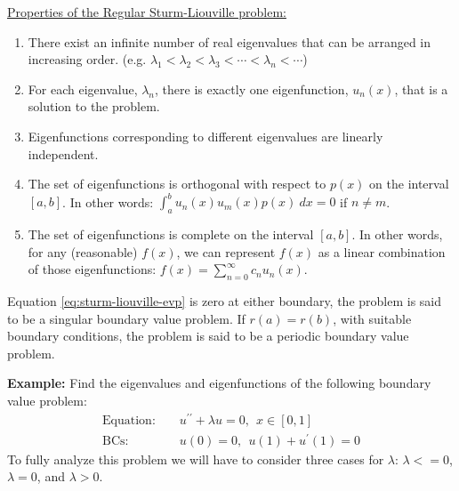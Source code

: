 \vspace{5.0cm}

\noindent\underline{Properties of the Regular Sturm-Liouville problem:}
\begin{enumerate}
\item There exist an infinite number of real eigenvalues that can be arranged in increasing order. (e.g. $\lambda_1 < \lambda_2 < \lambda_3 < \cdots < \lambda_n < \cdots$)
\item For each eigenvalue, $\lambda_n$, there is exactly one eigenfunction, $u_n(x)$, that is a solution to the problem.

\item Eigenfunctions corresponding to different eigenvalues are linearly independent.

\item The set of eigenfunctions is orthogonal with respect to $p(x)$ on the interval $[a,b]$.  In other words: $\int_{a}^{b}u_n(x) u_m(x) p(x) \ dx = 0$ if $n \ne m$.

\item The set of eigenfunctions is complete on the interval $[a,b]$.  In other words, for any (reasonable) $f(x)$, we can represent $f(x)$ as a linear combination of those eigenfunctions: $f(x) = \sum_{n=0}^{\infty} c_n u_n(x)$.
\end{enumerate}


 Equation \ref{eq:sturm-liouville-evp} is zero at either boundary, the problem is said to be a singular boundary value problem.  If $r(a) = r(b)$, with suitable boundary conditions, the problem is said to be a periodic boundary value problem.

\vspace{1.0cm}

\noindent\textbf{Example:} Find the eigenvalues and eigenfunctions of the following boundary value problem:
\begin{align*}
\text{Equation: }& & u^{\prime \prime}+\lambda u = 0,  \ \ x\in[0,1] \\
\text{BCs: }& & u(0) = 0, \ \ u(1) + u^{\prime}(1) = 0
\end{align*}
To fully analyze this problem we will have to consider three cases for $\lambda$: $\lambda < =0$, $\lambda = 0$, and $\lambda > 0$.

